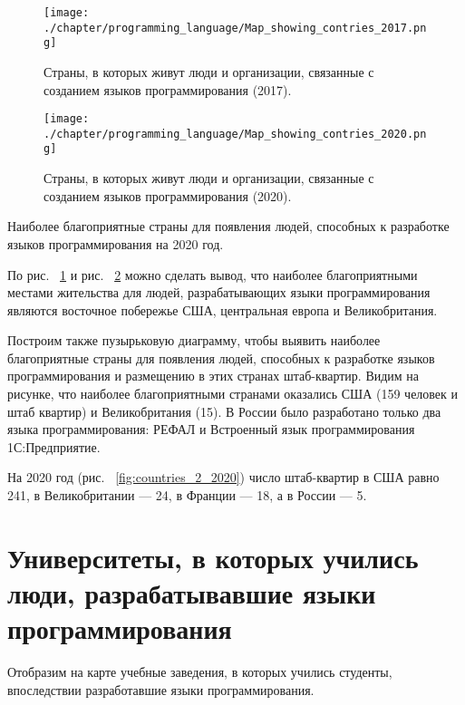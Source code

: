 \begin{figure}[h]
\centering
	\texttt{[image: ./chapter/programming\_language/Map\_showing\_contries\_2017.png]}
	\caption{Страны, в которых живут люди и организации, связанные с созданием языков программирования (2017).}
	\label{fig:countries_2017}
\end{figure}
\begin{figure}[h]
\centering
	\texttt{[image: ./chapter/programming\_language/Map\_showing\_contries\_2020.png]}
	\caption{Страны, в которых живут люди и организации, связанные с созданием языков программирования (2020).}
	\label{fig:countries_2020}
\end{figure}

\begin{marginfigure}
{
\setlength{\fboxsep}{0pt}%
\setlength{\fboxrule}{1pt}%
%
}
  \caption{Наиболее благоприятные страны для появления людей, способных к разработке языков программирования на 2020 год.}%
  \label{fig:countries_2_2020}%
\end{marginfigure}
По  рис. ~\ref{fig:countries_2017} и рис. ~\ref{fig:countries_2020} можно сделать вывод, что наиболее благоприятными местами жительства для людей, разрабатывающих языки программирования являются восточное побережье США, центральная европа и Великобритания.

Построим также пузырьковую диаграмму, чтобы выявить наиболее благоприятные страны для появления людей, способных к разработке языков программирования и размещению в этих странах штаб-квартир. Видим на рисунке, что наиболее благоприятными странами оказались США (159 человек и штаб квартир) и Великобритания (15). В России было разработано только два языка программирования: РЕФАЛ и Встроенный язык программирования 1С:Предприятие.

На 2020 год (рис. ~\ref{fig:countries_2_2020}) число штаб-квартир в США равно 241, в Великобритании — 24, в Франции — 18, а в России — 5.

\section{Университеты, в которых учились люди, разрабатывавшие языки программирования}
Отобразим на карте учебные заведения, в которых учились студенты, впоследствии разработавшие языки программирования.

